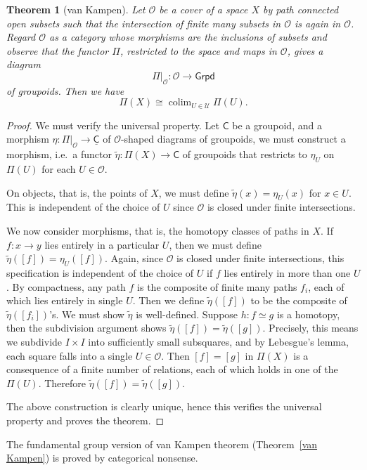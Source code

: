 \documentclass[a4paper]{amsart}
\theoremstyle{plain}
\newtheorem{thm}{Theorem}[section]
\theoremstyle{definition}
\theoremstyle{remark}
\DeclareMathOperator*{\colim}{colim}
\begin{document}
\begin{thm}[van Kampen]
    Let $\mathscr{O}$ be a cover of a space $X$ by path connected open subsets such that the intersection of finite many subsets in $\mathscr{O}$ is again in $\mathscr{O}$.
    Regard $\mathscr{O}$ as a category whose morphisms are the inclusions of subsets and observe that the functor $\Pi$, restricted to the space and maps in $\mathscr{O}$, gives a diagram
    \[\Pi|_\mathscr{O}:\mathscr{O}\to\mathsf{Grpd}\]
    of groupoids.
    Then we have
    \[\Pi(X)\cong\colim_{U\in\mathscr{U}}\Pi(U).\]
\end{thm}
\begin{proof}
    We must verify the universal property.
    Let $\mathsf{C}$ be a groupoid, and a morphism $\eta:\Pi|_\mathscr{O}\to\underline{\mathsf{C}}$ of $\mathscr{O}$-shaped diagrams of groupoids, we must construct a morphism, i.e.\ a functor $\tilde\eta:\Pi(X)\to\mathsf{C}$ of groupoids that restricts to $\eta_U$ on $\Pi(U)$ for each $U\in\mathscr{O}$.

    On objects, that is, the points of $X$, we must define $\tilde\eta(x)=\eta_U(x)$ for $x\in U$.
    This is independent of the choice of $U$ since $\mathscr{O}$ is closed under finite intersections.

    We now consider morphisms, that is, the homotopy classes of paths in $X$.
    If $f:x\to y$ lies entirely in a particular $U$, then we must define $\tilde\eta([f])=\eta_U([f])$.
    Again, since $\mathscr{O}$ is closed under finite intersections, this specification is independent of the choice of $U$ if $f$ lies entirely in more than one $U$.
    By compactness, any path $f$ is the composite of finite many paths $f_i$, each of which lies entirely in single $U$.
    Then we define $\tilde\eta([f])$ to be the composite of $\tilde\eta([f_i])$'s.
    We must show $\tilde\eta$ is well-defined.
    Suppose $h:f\simeq g$ is a homotopy, then the subdivision argument shows $\tilde\eta([f])=\tilde\eta([g])$.
    Precisely, this means we subdivide $I\times I$ into sufficiently small subsquares, and by Lebesgue's lemma, each square falls into a single $U\in\mathscr{O}$.
    Then $[f]=[g]$ in $\Pi(X)$ is a consequence of a finite number of relations, each of which holds in one of the $\Pi(U)$.
    Therefore $\tilde\eta([f])=\tilde\eta([g])$.

    The above construction is clearly unique, hence this verifies the universal property and proves the theorem.
\end{proof}

The fundamental group version of van Kampen theorem (Theorem~\ref{van Kampen}) is proved by categorical nonsense.
\end{document}
